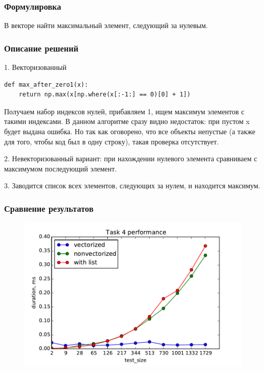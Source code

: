 \documentclass[12pt]{article}
\begin{document}
\subsubsection*{Формулировка}

В векторе найти максимальный элемент, следующий за нулевым.

\subsubsection*{Описание решений}

1. Векторизованный
\begin{lstlisting}
def max_after_zero1(x):
    return np.max(x[np.where(x[:-1:] == 0)[0] + 1])
\end{lstlisting}
Получаем набор индексов нулей, прибавляем 1, ищем максимум элементов с такими индексами.
В данном алгоритме сразу видно недостаток: при пустом x будет выдана ошибка. Но так как оговорено, что все объекты непустые (а также для того, чтобы код был в одну строку), такая проверка отсутствует.

2. Невекторизованный вариант: при нахождении нулевого элемента сравниваем с максимумом последующий элемент.

3. Заводится список всех элементов, следующих за нулем, и находится максимум.

\subsubsection*{Сравнение результатов}

\begin{figure}[h]
	\begin{center}
		\includegraphics[scale=0.7]{task4}
	\end{center}
\end{figure}
\end{document}
